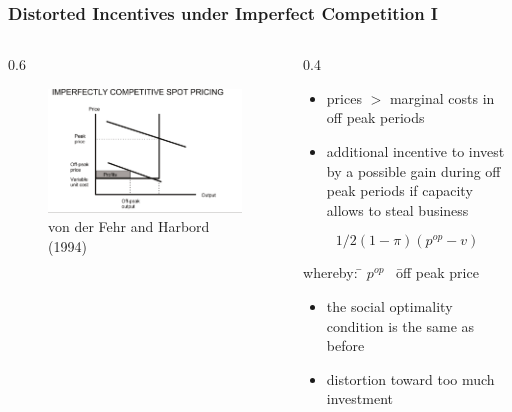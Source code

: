 \begin{frame}

\frametitle{Distorted Incentives under Imperfect Competition I}
\begin{columns}
\begin{column} {0.6\textwidth}

\begin{figure}[h]
\centering
\includegraphics[width=1.\textwidth]{capacity/peak_load_toohigh}
    \caption{von der Fehr and Harbord (1994)}
    \label{fig:Daten 2004}            
\end{figure}
\end{column}

\begin{column} {0.4\textwidth}
\begin{itemize}
\item prices $>$ marginal costs in off peak periods 
\item additional incentive to invest by a possible gain during off peak periods if capacity allows to steal business
\end {itemize}
  
\begin{equation}
	1/2 (1-\pi) (p^{op}-v)
\end{equation} 
{\small
\begin{tabbing}
whereby: \= $p^{op}$ \  \= off peak price
\end{tabbing}}

\begin{itemize}
\item the social optimality condition is the same as before
\item distortion toward too much investment
\end {itemize}

\end{column}
\end{columns}
	

\end{frame}

